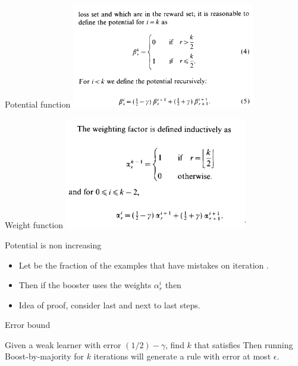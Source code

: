\documentclass[handout]{beamer}
\begin{document}
\begin{frame}{Potential function}
\includegraphics[width=8cm]{figures/BBMPotential.png}
\end{frame}

\begin{frame}{Weight function}
\includegraphics[width=8cm]{figures/BBMWeighting.png}
\end{frame}

\begin{frame}{Potential is non increasing}
  \begin{itemize}
  \item Let  be the fraction of the examples that have
     mistakes on iteration . 
  \item Then if the booster uses the weights $\alpha_r^i$ then
    \R{\[
        \beta_{0}^{0}
        \;>\;
        \sum_{r=0}^{1} q_{r}^{1}\,\beta_{r}^{1}
        \;>\;
        \sum_{r=0}^{2} q_{r}^{2}\,\beta_{r}^{2}
        \;>\;
        \cdots
        \;>\;
        \sum_{r=0}^{k} q_{r}^{k}\,\beta_{r}^{k}.
      \]}
    \item Idea of proof, consider last and next to last steps.
  \end{itemize}

\end{frame}

\begin{frame}{Error bound}

  Given a weak learner with error $(1/2)-\gamma$, find $k$ that satisfies
\R{\[
  \sum_{j=0}^{\left\lfloor \frac{k}{2} \right\rfloor}
  \binom{k}{j}
  \bigl(\tfrac12 + \gamma\bigr)^{j}\,
  \bigl(\tfrac12 - \gamma\bigr)^{\,k - j}
  \;\;\le\;\;
  \epsilon.
\]}
Then running Boost-by-majority for $k$ iterations will generate a rule with 
error at most $\epsilon$.

\end{frame}
\end{document}
